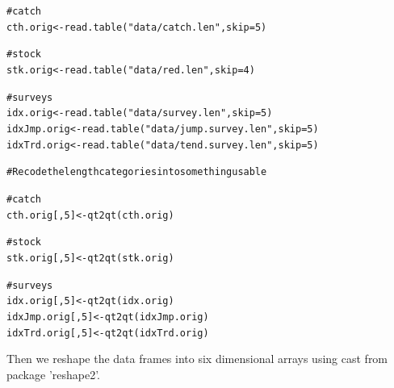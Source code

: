 \documentclass[a4paper,english,10pt]{article}\usepackage[]{graphicx}\usepackage[]{color}
\makeatletter
\newcommand{\hlnum}[1]{\textcolor[rgb]{0.2,0.2,0.2}{#1}}%
\newcommand{\hlstr}[1]{\textcolor[rgb]{0.2,0.2,0.2}{#1}}%
\newcommand{\hlcom}[1]{\textcolor[rgb]{0.2,0.267,0.4}{#1}}%
\newcommand{\hlstd}[1]{\textcolor[rgb]{0,0,0}{#1}}%
\newcommand{\hlkwb}[1]{\textcolor[rgb]{0.361,0.506,0.596}{#1}}%
\newcommand{\hlkwc}[1]{\textcolor[rgb]{0.361,0.506,0.596}{#1}}%
\newcommand{\hlkwd}[1]{\textcolor[rgb]{0.361,0.506,0.596}{#1}}%
\newenvironment{kframe}{%
 \def\at@end@of@kframe{}%
 \ifinner\ifhmode%
  \def\at@end@of@kframe{\end{minipage}}%
  \begin{minipage}{\columnwidth}%
 \fi\fi%
 \def\FrameCommand##1{\hskip\@totalleftmargin \hskip-\fboxsep
 \colorbox{shadecolor}{##1}\hskip-\fboxsep
     \hskip-\linewidth \hskip-\@totalleftmargin \hskip\columnwidth}%
 \MakeFramed {\advance\hsize-\width
   \@totalleftmargin\z@ \linewidth\hsize
   \@setminipage}}%
 {\par\unskip\endMakeFramed%
 \at@end@of@kframe}
\newenvironment{knitrout}{}{} %
\makeatother
\begin{document}
\begin{knitrout}
\color{fgcolor}\begin{kframe}
\begin{alltt}
\hlcom{# catch}
\hlstd{cth.orig} \hlkwb{<-} \hlkwd{read.table}\hlstd{(}\hlstr{"data/catch.len"}\hlstd{,} \hlkwc{skip} \hlstd{=} \hlnum{5}\hlstd{)}

\hlcom{# stock}
\hlstd{stk.orig} \hlkwb{<-} \hlkwd{read.table}\hlstd{(}\hlstr{"data/red.len"}\hlstd{,} \hlkwc{skip} \hlstd{=} \hlnum{4}\hlstd{)}

\hlcom{# surveys}
\hlstd{idx.orig} \hlkwb{<-} \hlkwd{read.table}\hlstd{(}\hlstr{"data/survey.len"}\hlstd{,} \hlkwc{skip} \hlstd{=} \hlnum{5}\hlstd{)}
\hlstd{idxJmp.orig} \hlkwb{<-} \hlkwd{read.table}\hlstd{(}\hlstr{"data/jump.survey.len"}\hlstd{,} \hlkwc{skip} \hlstd{=} \hlnum{5}\hlstd{)}
\hlstd{idxTrd.orig} \hlkwb{<-} \hlkwd{read.table}\hlstd{(}\hlstr{"data/tend.survey.len"}\hlstd{,} \hlkwc{skip} \hlstd{=} \hlnum{5}\hlstd{)}

\hlcom{# Recode the length categories into something usable}

\hlcom{# catch}
\hlstd{cth.orig[,} \hlnum{5}\hlstd{]} \hlkwb{<-} \hlkwd{qt2qt}\hlstd{(cth.orig)}

\hlcom{# stock}
\hlstd{stk.orig[,} \hlnum{5}\hlstd{]} \hlkwb{<-} \hlkwd{qt2qt}\hlstd{(stk.orig)}

\hlcom{# surveys}
\hlstd{idx.orig[,} \hlnum{5}\hlstd{]} \hlkwb{<-} \hlkwd{qt2qt}\hlstd{(idx.orig)}
\hlstd{idxJmp.orig[,} \hlnum{5}\hlstd{]} \hlkwb{<-} \hlkwd{qt2qt}\hlstd{(idxJmp.orig)}
\hlstd{idxTrd.orig[,} \hlnum{5}\hlstd{]} \hlkwb{<-} \hlkwd{qt2qt}\hlstd{(idxTrd.orig)}
\end{alltt}
\end{kframe}
\end{knitrout}


Then we reshape the data frames into six dimensional arrays using cast from package 'reshape2'.
\end{document}
